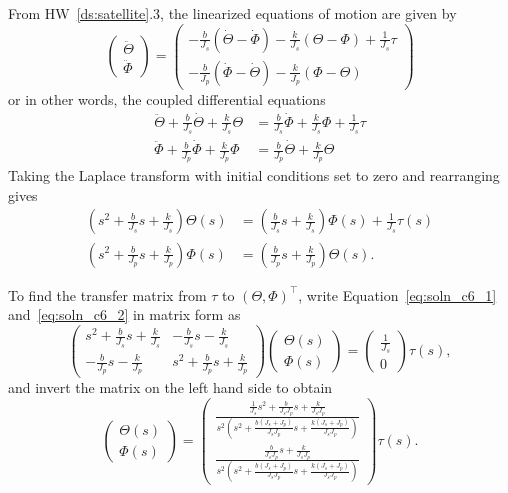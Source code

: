 
From HW~\ref{ds:satellite}.3, the linearized equations of motion are given by
\[
\begin{pmatrix}\ddot{\Theta} \\ \ddot{\Phi} \end{pmatrix} 
= \begin{pmatrix} -\frac{b}{J_s}(\dot{\Theta}-\dot{\Phi})-\frac{k}{J_s}(\Theta-\Phi)+\frac{1}{J_s}\tau \\ -\frac{b}{J_p}(\dot{\Phi}-\dot{\Theta}) -\frac{k}{J_p}(\Phi-\Theta) \end{pmatrix}
\]
or in other words, the coupled differential equations
\begin{align*}
\ddot{\Theta} + \frac{b}{J_s}\dot{\Theta} + \frac{k}{J_s}\Theta  &= \frac{b}{J_s}\dot{\Phi}+\frac{k}{J_s}\Phi+\frac{1}{J_s}\tau \\
\ddot{\Phi} + \frac{b}{J_p}\dot{\Phi} +\frac{k}{J_p}\Phi &= \frac{b}{J_p}\dot{\Theta} + \frac{k}{J_p}\Theta
\end{align*}
Taking the Laplace transform with initial conditions set to zero and rearranging gives
\begin{align}
(s^2+\frac{b}{J_s}s+\frac{k}{J_s})\Theta(s)  &= (\frac{b}{J_s}s+\frac{k}{J_s})\Phi(s)+\frac{1}{J_s}\tau(s) 
\label{eq:soln_c6_1}\\
(s^2+\frac{b}{J_p}s+\frac{k}{J_p})\Phi(s) &= (\frac{b}{J_p}s+\frac{k}{J_p})\Theta(s).
\label{eq:soln_c6_2}
\end{align}

To find the transfer matrix from $\tau$ to $(\Theta, \Phi)^\top$, write Equation~\eqref{eq:soln_c6_1} and~\eqref{eq:soln_c6_2} in matrix form as
\[
\left(\begin{array}{c|c}
s^2+\frac{b}{J_s}s+\frac{k}{J_s} & -\frac{b}{J_s}s-\frac{k}{J_s} \\\hline 
-\frac{b}{J_p}s-\frac{k}{J_p} & s^2+\frac{b}{J_p}s+\frac{k}{J_p} \end{array}\right)
\begin{pmatrix}\Theta(s) \\ \Phi(s) \end{pmatrix} 
= \begin{pmatrix} \frac{1}{J_s} \\ 0 \end{pmatrix} \tau(s),
\]
and invert the matrix on the left hand side to obtain
\[
\begin{pmatrix}\Theta(s) \\ \Phi(s) \end{pmatrix} 
= \begin{pmatrix} 
\frac{\frac{1}{J_s}s^2+\frac{b}{J_sJ_p}s+\frac{k}{J_sJ_p}}{s^2\left( s^2+\frac{b(J_s+J_p)}{J_sJ_p}s+\frac{k(J_s+J_p)}{J_sJ_p} \right)}
\\ 
\frac{\frac{b}{J_sJ_p}s+\frac{k}{J_sJ_p}}{s^2\left( s^2+\frac{b(J_s+J_p)}{J_sJ_p}s+\frac{k(J_s+J_p)}{J_sJ_p} \right)}
\end{pmatrix} \tau(s).
\]


